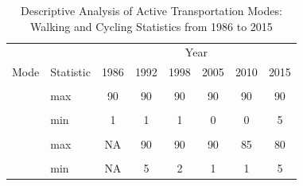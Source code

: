 \documentclass[12pt,twoside]{reedthesis}
\begin{document}
\begingroup\fontsize{12}{14}\selectfont
\begin{longtable}[t]{>{}llcccccc}
\caption{\label{tab:unnamed-chunk-12}\label{tab:table_13}Descriptive Analysis of Active Transportation Modes: Walking and Cycling Statistics from 1986 to 2015}\\
\toprule
\multicolumn{2}{c}{ } & \multicolumn{6}{c}{Year} \\
\cmidrule(l{3pt}r{3pt}){3-8}
Mode & Statistic & 1986 & 1992 & 1998 & 2005 & 2010 & 2015\\
\midrule
\textbf{\cellcolor{gray!6}{walking}} & \cellcolor{gray!6}{Count} & \cellcolor{gray!6}{384} & \cellcolor{gray!6}{1473} & \cellcolor{gray!6}{1657} & \cellcolor{gray!6}{5517} & \cellcolor{gray!6}{4360} & \cellcolor{gray!6}{2796}\\
\cmidrule{1-8}\pagebreak[0]
\textbf{} & max & 90 & 90 & 90 & 90 & 90 & 90\\
\cmidrule{1-8}\pagebreak[0]
\textbf{\cellcolor{gray!6}{}} & \cellcolor{gray!6}{mean} & \cellcolor{gray!6}{24} & \cellcolor{gray!6}{17} & \cellcolor{gray!6}{10} & \cellcolor{gray!6}{12} & \cellcolor{gray!6}{12} & \cellcolor{gray!6}{16}\\
\cmidrule{1-8}\pagebreak[0]
\textbf{} & min & 1 & 1 & 1 & 0 & 0 & 5\\
\cmidrule{1-8}\pagebreak[0]
\textbf{\cellcolor{gray!6}{cycling}} & \cellcolor{gray!6}{Count} & \cellcolor{gray!6}{NA} & \cellcolor{gray!6}{126} & \cellcolor{gray!6}{119} & \cellcolor{gray!6}{325} & \cellcolor{gray!6}{214} & \cellcolor{gray!6}{217}\\
\cmidrule{1-8}\pagebreak[0]
\textbf{} & max & NA & 90 & 90 & 90 & 85 & 80\\
\cmidrule{1-8}\pagebreak[0]
\textbf{\cellcolor{gray!6}{}} & \cellcolor{gray!6}{mean} & \cellcolor{gray!6}{NA} & \cellcolor{gray!6}{24} & \cellcolor{gray!6}{21} & \cellcolor{gray!6}{18} & \cellcolor{gray!6}{19} & \cellcolor{gray!6}{22}\\
\cmidrule{1-8}\pagebreak[0]
\textbf{} & min & NA & 5 & 2 & 1 & 1 & 5\\
\bottomrule
\end{longtable}
\endgroup{}
\end{document}
